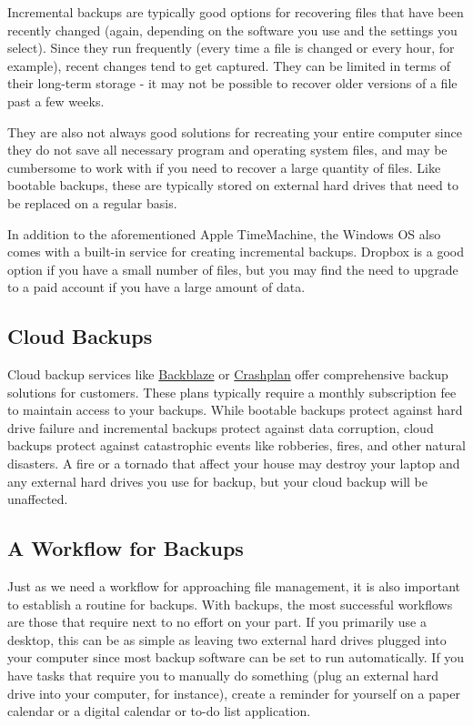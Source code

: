 \documentclass[]{book}
\theoremstyle{definition}
\theoremstyle{definition}
\theoremstyle{definition}
\theoremstyle{remark}
\begin{document}
Incremental backups are typically good options for recovering files that
have been recently changed (again, depending on the software you use and
the settings you select). Since they run frequently (every time a file
is changed or every hour, for example), recent changes tend to get
captured. They can be limited in terms of their long-term storage - it
may not be possible to recover older versions of a file past a few
weeks.

They are also not always good solutions for recreating your entire
computer since they do not save all necessary program and operating
system files, and may be cumbersome to work with if you need to recover
a large quantity of files. Like bootable backups, these are typically
stored on external hard drives that need to be replaced on a regular
basis.

In addition to the aforementioned Apple TimeMachine, the Windows OS also
comes with a built-in service for creating incremental backups. Dropbox
is a good option if you have a small number of files, but you may find
the need to upgrade to a paid account if you have a large amount of
data.

\subsection{Cloud Backups}\label{cloud-backups}

Cloud backup services like \href{https://www.backblaze.com}{Backblaze}
or \href{https://www.code42.com/crashplan/}{Crashplan} offer
comprehensive backup solutions for customers. These plans typically
require a monthly subscription fee to maintain access to your backups.
While bootable backups protect against hard drive failure and
incremental backups protect against data corruption, cloud backups
protect against catastrophic events like robberies, fires, and other
natural disasters. A fire or a tornado that affect your house may
destroy your laptop and any external hard drives you use for backup, but
your cloud backup will be unaffected.

\subsection{A Workflow for Backups}\label{a-workflow-for-backups}

Just as we need a workflow for approaching file management, it is also
important to establish a routine for backups. With backups, the most
successful workflows are those that require next to no effort on your
part. If you primarily use a desktop, this can be as simple as leaving
two external hard drives plugged into your computer since most backup
software can be set to run automatically. If you have tasks that require
you to manually do something (plug an external hard drive into your
computer, for instance), create a reminder for yourself on a paper
calendar or a digital calendar or to-do list application.
\end{document}
